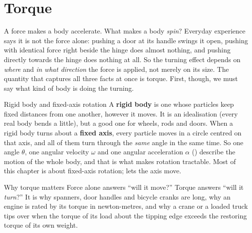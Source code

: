 
\section{Torque}
A force makes a body accelerate. What makes a body \emph{spin}? Everyday experience says it is not the
force alone: pushing a door at its handle swings it open, pushing with identical force right beside the
hinge does almost nothing, and pushing directly towards the hinge does nothing at all. So the turning
effect depends on \emph{where} and \emph{in what direction} the force is applied, not merely on its
size. The quantity that captures all three facts at once is torque. First, though, we must say what kind
of body is doing the turning.

\begin{defbox}{Rigid body and fixed-axis rotation}
A \textbf{rigid body} is one whose particles keep fixed distances from one another, however it moves. It
is an idealisation (every real body bends a little), but a good one for wheels, rods and doors. When a
rigid body turns about a \textbf{fixed axis}, every particle moves in a circle centred on that axis, and
all of them turn through the \emph{same} angle in the same time. So one angle $\theta$, one angular
velocity $\omega$ and one angular acceleration $\alpha$ () describe the motion of the
whole body, and that is what makes rotation tractable. Most of this chapter is about fixed-axis rotation;
 lets the axis move.
\end{defbox}

\begin{motivbox}{Why torque matters}
Force alone answers ``will it move?'' Torque answers ``will it \emph{turn}?'' It is why spanners, door
handles and bicycle cranks are long, why an engine is rated by its torque in newton-metres, and why a
crane or a loaded truck tips over when the torque of its load about the tipping edge exceeds the
restoring torque of its own weight.
\end{motivbox}

